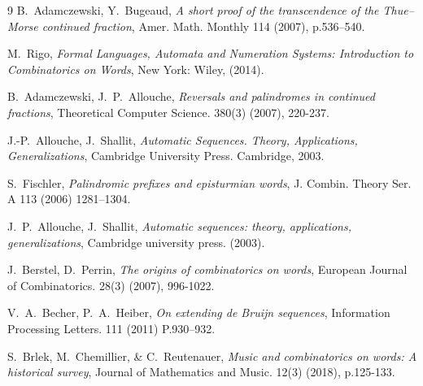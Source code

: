 \documentclass[12pt]{amsart}
\begin{document}
\begin{thebibliography}{9}
 B.~Adamczewski, Y.~Bugeaud, \emph{A short proof of the transcendence of the Thue–Morse continued fraction}, Amer. Math. Monthly 114 (2007), p.536–540.

 M.~Rigo, \emph{Formal Languages, Automata and Numeration Systems: Introduction to Combinatorics on Words}, New York: Wiley, (2014).

 B.~Adamczewski, J.~P.~Allouche, \emph{Reversals and palindromes in continued fractions}, Theoretical Computer Science. 380(3) (2007), 220-237.

 J.-P.~Allouche, J.~Shallit, \emph{Automatic Sequences. Theory, Applications, Generalizations}, Cambridge University Press. Cambridge, 2003.

 S.~Fischler, \emph{Palindromic prefixes and episturmian words}, J. Combin. Theory Ser. A 113 (2006) 1281–1304.

 J.~P.~Allouche, J.~Shallit, \emph{Automatic sequences: theory, applications, generalizations}, Cambridge university press. (2003).

 J.~Berstel, D.~Perrin, \emph{The origins of combinatorics on words}, European Journal of Combinatorics. 28(3) (2007), 996-1022.

 V.~A.~Becher, P.~A.~Heiber, \emph{On extending de Bruijn sequences}, Information Processing Letters. 111 (2011) P.930–932.

 S.~Brlek, M.~Chemillier, \& C.~Reutenauer, \emph{Music and combinatorics on words: A historical survey}, Journal of Mathematics and Music. 12(3) (2018), p.125-133.
\end{thebibliography}
 
\end{document}
